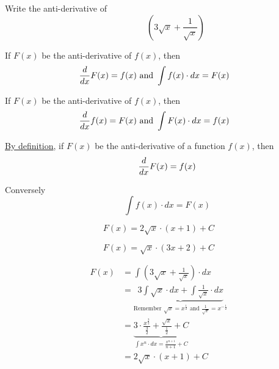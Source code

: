\documentclass[14pt,fleqn]{extarticle}
\newcommand\fx{ \left(3\sqrt{x} + \frac{1}{\sqrt{x}} \right)}
\begin{document}
\begin{problem}
	\statement 
    
    Write the anti-derivative of 
    \[ \qquad\qquad  \fx \] 
    
    \begin{step}
  \begin{options} 
     \correct 
       
     If $F(x)$ be the anti-derivative of $f(x)$, then 
     \begin{align}
	     \frac{d}{dx} F(x) &= f(x) \text{ and } \int f(x)\cdot dx = F(x) 
\end{align}
     \incorrect
        
          
     If $F(x)$ be the anti-derivative of $f(x)$, then 
     \begin{align}
	     \frac{d}{dx} f(x) &= F(x) \text{ and } \int F(x)\cdot dx = f(x) 
\end{align}
    \end{options} 
     \reason 
     
     \underline{By definition}, if $F(x)$ be the anti-derivative of a function $f(x)$, then 
     \[ \qquad \frac{d}{dx} F(x) = f(x) \]
     
     Conversely 
     \[ \qquad \int f(x)\cdot dx = F(x) \]
       
\end{step}

\begin{step}
  \begin{options} 
     \correct 
       
       \[ F(x) = 2\sqrt{x}\cdot \left(x+1 \right) + C  \]
     \incorrect
        
      \[ F(x) = \sqrt{x}\cdot \left(3x + 2 \right) + C  \]
    \end{options} 
     \reason 
       
       \begin{align}
	F(x) &= \int \fx\cdot dx \\
	&= \underbrace{3\int \sqrt{x}\cdot dx + \int \frac{1}{\sqrt{x}}\cdot dx}_{\text{Remember } \sqrt{x} = x^{\frac{1}{2}}\text{ and } \frac{1}{\sqrt{x}}= x^{-\frac{1}{2}}} \\ 
	&= \underbrace{3 \cdot \frac{x^{\frac{3}{2}}}{\frac{3}{2}} + \frac{\sqrt{x}}{\frac{1}{2}} + C}_{\int x^n \cdot dx = \frac{x^{n+1}}{n+1} + C} \\
	&= 2\sqrt{x}\cdot \left(x+1 \right) + C 
\end{align}
\end{step}
\end{problem} 
\end{document}

